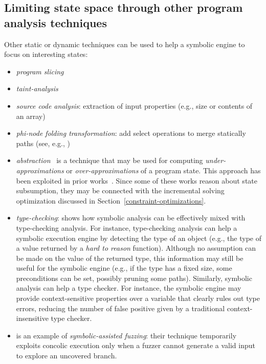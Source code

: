 \subsection{Limiting state space through other program analysis techniques}

Other static or dynamic techniques can be used to help a symbolic engine to focus on interesting states:
\begin{itemize}
  \item {\em program slicing}
  \item {\em taint-analysis}
  \item {\em source code analysis}: extraction of input properties (e.g., size or contents of an array)
  \item {\em phi-node folding transformation}: add select operations to merge statically paths (see, e.g., \cite{CCK-EUROSYS11})
  \item {\em abstraction}~\cite{C-SEFM07} is a technique that may be used for computing {\em under-approximations} or {\em over-approximations} of a program state. This approach has been exploited in prior works~\cite{APV-SPIN06,VPP-ISSTA06,XGM-ISSTA08}. Since some of these works reason about state subsumption, they may be connected with the incremental solving optimization discussed in Section~\ref{constraint-optimizations}.
  \item {\em type-checking}: \cite{KCF-PLDI10} shows how symbolic analysis can be effectively mixed with type-checking analysis. For instance, type-checking analysis can help a symbolic execution engine by detecting the type of an object (e.g., the type of a value returned by a {\em hard to reason} function). Although no assumption can be made on the value of the returned type, this information may still be useful for the symbolic engine (e.g., if the type has a fixed size, some preconditions can be set, possibly pruning some paths). Similarly, symbolic analysis can help a type checker. For instance, the symbolic engine may provide context-sensitive properties over a variable that clearly rules out type errors, reducing the number of false positive given by a traditional context-insensitive type checker.
  \item \cite{DRILLER-NDSS16} is an example of {\em symbolic-assisted fuzzing}: their technique temporarily exploits concolic execution only when a fuzzer cannot generate a valid input to explore an uncovered branch.
\end{itemize}

